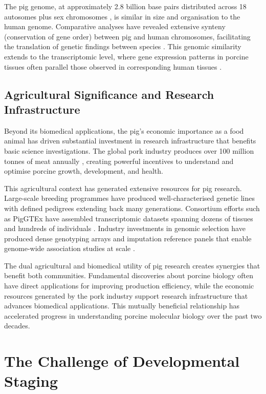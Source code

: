 The pig genome, at approximately 2.8 billion base pairs distributed across 18 autosomes plus sex chromosomes \parencite{groenen_analyses_2012}, is similar in size and organisation to the human genome. Comparative analyses have revealed extensive synteny (conservation of gene order) between pig and human chromosomes, facilitating the translation of genetic findings between species \parencite{warr_improved_2020, groenen_analyses_2012}. This genomic similarity extends to the transcriptomic level, where gene expression patterns in porcine tissues often parallel those observed in corresponding human tissues \parencite{cardoso-moreira_gene_2019}.

\subsection{Agricultural Significance and Research Infrastructure}

Beyond its biomedical applications, the pig's economic importance as a food animal has driven substantial investment in research infrastructure that benefits basic science investigations. The global pork industry produces over 100 million tonnes of meat annually \parencite{kim__2023}, creating powerful incentives to understand and optimise porcine growth, development, and health.

This agricultural context has generated extensive resources for pig research. Large-scale breeding programmes have produced well-characterised genetic lines with defined pedigrees extending back many generations. Consortium efforts such as PigGTEx have assembled transcriptomic datasets spanning dozens of tissues and hundreds of individuals \parencite{teng_compendium_2024}. Industry investments in genomic selection have produced dense genotyping arrays and imputation reference panels that enable genome-wide association studies at scale \parencite{groenen_analyses_2012, ramos_design_2009}.

The dual agricultural and biomedical utility of pig research creates synergies that benefit both communities. Fundamental discoveries about porcine biology often have direct applications for improving production efficiency, while the economic resources generated by the pork industry support research infrastructure that advances biomedical applications. This mutually beneficial relationship has accelerated progress in understanding porcine molecular biology over the past two decades.


\section{The Challenge of Developmental Staging}\label{sec:intro:challenge}

